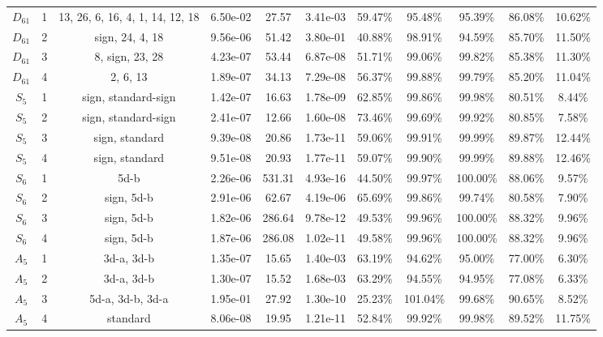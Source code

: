 \begin{tabular}{ccccccccccc}
 $D_{61}$ &    1 & 13, 26, 6, 16, 4, 1, 14, 12, 18 &  6.50e-02 &     27.57 &  3.41e-03 &   59.47\% &   95.48\% &   95.39\% & 86.08\% &            10.62\% \\
 $D_{61}$ &    2 &                 sign, 24, 4, 18 &  9.56e-06 &     51.42 &  3.80e-01 &   40.88\% &   98.91\% &   94.59\% & 85.70\% &            11.50\% \\
 $D_{61}$ &    3 &                 8, sign, 23, 28 &  4.23e-07 &     53.44 &  6.87e-08 &   51.71\% &   99.06\% &   99.82\% & 85.38\% &            11.30\% \\
 $D_{61}$ &    4 &                        2, 6, 13 &  1.89e-07 &     34.13 &  7.29e-08 &   56.37\% &   99.88\% &   99.79\% & 85.20\% &            11.04\% \\
  $S_{5}$ &    1 &             sign, standard-sign &  1.42e-07 &     16.63 &  1.78e-09 &   62.85\% &   99.86\% &   99.98\% & 80.51\% &             8.44\% \\
  $S_{5}$ &    2 &             sign, standard-sign &  2.41e-07 &     12.66 &  1.60e-08 &   73.46\% &   99.69\% &   99.92\% & 80.85\% &             7.58\% \\
  $S_{5}$ &    3 &                  sign, standard &  9.39e-08 &     20.86 &  1.73e-11 &   59.06\% &   99.91\% &   99.99\% & 89.87\% &            12.44\% \\
  $S_{5}$ &    4 &                  sign, standard &  9.51e-08 &     20.93 &  1.77e-11 &   59.07\% &   99.90\% &   99.99\% & 89.88\% &            12.46\% \\
  $S_{6}$ &    1 &                            5d-b &  2.26e-06 &    531.31 &  4.93e-16 &   44.50\% &   99.97\% &  100.00\% & 88.06\% &             9.57\% \\
  $S_{6}$ &    2 &                      sign, 5d-b &  2.91e-06 &     62.67 &  4.19e-06 &   65.69\% &   99.86\% &   99.74\% & 80.58\% &             7.90\% \\
  $S_{6}$ &    3 &                      sign, 5d-b &  1.82e-06 &    286.64 &  9.78e-12 &   49.53\% &   99.96\% &  100.00\% & 88.32\% &             9.96\% \\
  $S_{6}$ &    4 &                      sign, 5d-b &  1.87e-06 &    286.08 &  1.02e-11 &   49.58\% &   99.96\% &  100.00\% & 88.32\% &             9.96\% \\
  $A_{5}$ &    1 &                      3d-a, 3d-b &  1.35e-07 &     15.65 &  1.40e-03 &   63.19\% &   94.62\% &   95.00\% & 77.00\% &             6.30\% \\
  $A_{5}$ &    2 &                      3d-a, 3d-b &  1.30e-07 &     15.52 &  1.68e-03 &   63.29\% &   94.55\% &   94.95\% & 77.08\% &             6.33\% \\
  $A_{5}$ &    3 &                5d-a, 3d-b, 3d-a &  1.95e-01 &     27.92 &  1.30e-10 &   25.23\% &  101.04\% &   99.68\% & 90.65\% &             8.52\% \\
  $A_{5}$ &    4 &                        standard &  8.06e-08 &     19.95 &  1.21e-11 &   52.84\% &   99.92\% &   99.98\% & 89.52\% &            11.75\% \\
\bottomrule
\end{tabular}
